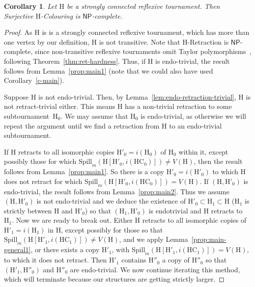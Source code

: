 \documentclass[a4paper,12pt]{article}
\newtheorem{corollary}{Corollary}
\theoremstyle{remark}
\newcommand{\NP}[0]{\ensuremath{\mathsf{NP}}}
\newcommand{\HC}[0]{\ensuremath{\mathrm{HC}}}
\renewcommand{\H}{\ensuremath{\mathrm{H}}}
\begin{document}
\begin{corollary}
Let $\H$ be a strongly connected reflexive tournament. 
Then {\sc Surjective $\H$-Colouring} is \NP-complete.
\label{cor:strongly-connected1}
\end{corollary}
\begin{proof}
As $\H$ is is a strongly connected reflexive tournament, which has more than one vertex by our definition, $\H$ is not transitive.
Note that {\sc $\H$-Retraction}
 is \NP-complete, since non-transitive reflexive tournaments omit Taylor polymorphisms~\cite{larose2006taylor}, following Theorem~\ref{thm:ret-hardness}. Thus, if $\H$ is endo-trivial, the result follows from Lemma~\ref{prop:main1} (note that we could also have used Corollary~\ref{c-main}).

Suppose $\H$ is not endo-trivial. Then, by Lemma~\ref{lem:endo-retraction-trivial}, $\H$ is not retract-trivial either. This means $\H$ has a non-trivial retraction to some subtournament~$\H_0$. We may assume
that $\H_0$ is endo-trivial, as otherwise we will repeat the argument until we find a retraction from $\H$ to an endo-trivial subtournament.
 
If $\H$ retracts to all isomorphic copies $\H'_0=i(\H_0)$ of $\H_0$ within it, except possibly those for which $\mathrm{Spill}_m(\H[\H'_0,i(\HC_0)]) \neq V(\H)$, then the result follows from  Lemma~\ref{prop:main1}. So there is a copy $\H'_0=i(\H'_0)$ to which $\H$ does not retract for which $\mathrm{Spill}_m(\H[\H'_0,i(\HC_0)]) = V(\H)$.
If $(\H,\H'_0)$ is endo-trivial, the result follows from Lemma~\ref{prop:main2}. Thus we assume $(\H,\H'_0)$ is not endo-trivial and we deduce the existence of $\H'_0 \subset \H_1 \subset \H$ ($\H_1$ is strictly between $\H$ and $\H'_0$) so that $(\H_1,\H'_0)$ is endotrivial and $\H$ retracts to $\H_1$. Now we are ready to break out. Either $\H$ retracts to all isomorphic copies of $\H'_1=i(\H_1)$ in $\H$, except possibly for those so that $\mathrm{Spill}_m(\H[\H'_1,i(\HC_1)]) \neq V(\H)$, and we apply Lemma~\ref{prop:main-general1}, or there exists a copy $\H'_1$, with $\mathrm{Spill}_m(\H[\H'_1,i(\HC_1)]) = V(\H)$, to which it does not retract. Then $\H'_1$ contains $\H''_0$ a copy of $\H''_0$ so that $(\H'_1,\H''_0)$ and $\H''_0$ are endo-trivial. We now continue iterating this method, which will terminate because our structures are getting strictly larger.
\end{proof}
\end{document}
